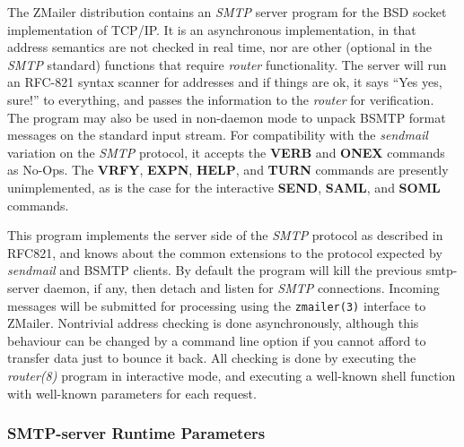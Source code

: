 \startdocument

The ZMailer distribution contains an {\em SMTP\/} server program for the BSD socket
implementation of TCP/IP.  It is an asynchronous implementation, in that
address semantics are not checked in real time, nor are other (optional in
the {\em SMTP\/} standard) functions that require {\em router\/} functionality. The server
will run an RFC-821 syntax scanner for addresses and if things are ok, it 
says ``Yes yes, sure!'' to everything, and passes the information to
the {\em router\/} for verification.  The program may also be used in non-daemon
mode to unpack BSMTP format messages on the standard input stream.  For
compatibility with the {\em sendmail\/} variation on the {\em SMTP\/} protocol, it accepts
the {\bf VERB} and {\bf ONEX} commands as No-Ops. The {\bf VRFY}, 
{\bf EXPN}, {\bf HELP}, and
{\bf TURN} commands are presently unimplemented, as is the case for the
interactive {\bf SEND}, {\bf SAML}, and {\bf SOML} commands.

This program implements the server side of the {\em SMTP\/} protocol as described in 
RFC821, and knows about the common extensions to the protocol expected by
{\em sendmail\/} and BSMTP clients. By default the program will kill the previous 
smtp-server daemon, if any, then detach and listen for {\em SMTP\/} connections. 
Incoming messages will be submitted for processing using the 
{\tt zmailer(3)} interface to ZMailer. Nontrivial address checking is 
done asynchronously, although this behaviour can be changed by a command 
line option if you cannot afford to transfer data just to bounce it back. 
All checking is done by executing the {\em router(8)\/} program in 
interactive mode, and executing a well-known shell function with well-known 
parameters for each request.




\subsubsection{SMTP-server Runtime Parameters}



